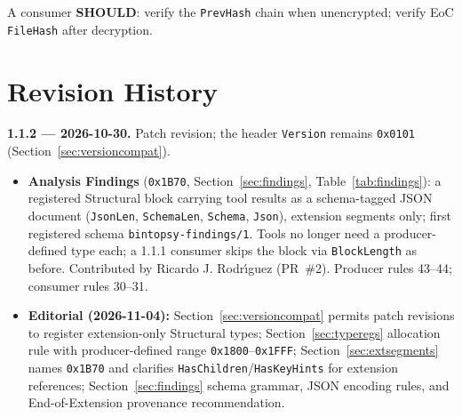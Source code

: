 \documentclass[11pt,a4paper]{article}
\newcommand{\SHOULD}{\textbf{SHOULD}}
\newcommand{\hex}[1]{\texttt{0x#1}}
\newcommand{\field}[1]{\texttt{#1}}
\begin{document}
\noindent A consumer \SHOULD: verify the \field{PrevHash} chain when unencrypted; verify EoC \field{FileHash} after decryption.

\section{Revision History}\label{sec:revhistory}
\noindent\textbf{1.1.2 --- 2026-10-30.} Patch revision; the header \field{Version} remains \hex{0101} (Section~\ref{sec:versioncompat}).
\begin{itemize}[leftmargin=1.5em, itemsep=3pt]
\item \textbf{Analysis Findings} (\hex{1B70}, Section~\ref{sec:findings}, Table~\ref{tab:findings}): a registered Structural block carrying tool results as a schema-tagged JSON document (\field{JsonLen}, \field{SchemaLen}, \field{Schema}, \field{Json}), extension segments only; first registered schema \texttt{bintopsy-findings/1}. Tools no longer need a producer-defined type each; a 1.1.1 consumer skips the block via \field{BlockLength} as before. Contributed by Ricardo J. Rodr\'{\i}guez (PR~\#2). Producer rules 43--44; consumer rules 30--31.
\item \textbf{Editorial (2026-11-04):} Section~\ref{sec:versioncompat} permits patch revisions to register extension-only Structural types; Section~\ref{sec:typeregs} allocation rule with producer-defined range \hex{1800}--\hex{1FFF}; Section~\ref{sec:extsegments} names \hex{1B70} and clarifies \field{HasChildren}/\field{HasKeyHints} for extension references; Section~\ref{sec:findings} schema grammar, JSON encoding rules, and End-of-Extension provenance recommendation.
\end{itemize}
\end{document}
